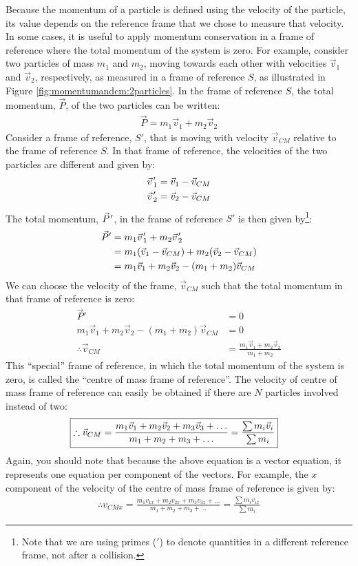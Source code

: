 Because the momentum of a particle is defined using the velocity of the particle, its value depends on the reference frame that we chose to measure that velocity. In some cases, it is useful to apply momentum conservation in a frame of reference where the total momentum of the system is zero. For example, consider two particles of mass $m_1$ and $m_2$, moving towards each other with velocities $\vec v_1$ and $\vec v_2$, respectively, as measured in a frame of reference $S$, as illustrated in Figure \ref{fig:momentumandcm:2particles}.
In the frame of reference $S$, the total momentum, $\vec P$, of the two particles can be written:
\begin{align*}
\vec P = m_1\vec v_1 + m_2\vec v_2
\end{align*}
Consider a frame of reference, $S'$, that is moving with velocity $\vec v_{CM}$ relative to the frame of reference $S$. In that frame of reference, the velocities of the two particles are different and given by:
\begin{align*}
\pvec v'_1&=\vec v_1- \vec v_{CM}\\
\pvec v'_2&=\vec v_2- \vec v_{CM}
\end{align*}
The total momentum, $\pvec P'$, in the frame of reference $S'$ is then given by\footnote{Note that we are using primes ($'$) to denote quantities in a different reference frame, not after a collision.}:
\begin{align*}
\vec P' &= m_1\pvec v'_1 + m_2 \pvec v'_2\\
&=m_1(\vec v_1- \vec v_{CM})+m_2(\vec v_2- \vec v_{CM})\\
&= m_1\vec v_1 + m_2\vec v_2 - (m_1+m_2) \vec v_{CM}
\end{align*}
We can choose the velocity of the frame, $\vec v_{CM}$ such that the total momentum in that frame of reference is zero:
\begin{align*}
\vec P' &= 0\\
m_1\vec v_1 + m_2\vec v_2 - (m_1+m_2) \vec v_{CM} &=0\\
\therefore \vec v_{CM} &= \frac{m_1\vec v_1 + m_2\vec v_2 }{m_1+m_2}
\end{align*}
This ``special'' frame of reference, in which the total momentum of the system is zero, is called the ``centre of mass frame of reference''. The velocity of centre of mass frame of reference can easily be obtained if there are $N$ particles involved instead of two:
\begin{align}
\Aboxed{\therefore \vec v_{CM} = \frac{m_1\vec v_1 + m_2\vec v_2 + m_3 \vec v_3 + \dots }{m_1+m_2+m_3+\dots}=\frac{\sum m_i\vec v_i}{\sum m_i}}
\end{align}
Again, you should note that because the above equation is a vector equation, it represents one equation per component of the vectors. For example, the $x$ component of the velocity of the centre of mass frame of reference is given by:
\begin{align*}
\therefore  v_{CMx} = \frac{m_1 v_{1x} + m_2v_{2x} + m_3 v_{3x} + \dots }{m_1+m_2+m_3+\dots}=\frac{\sum m_iv_{ix}}{\sum m_i}
\end{align*}


